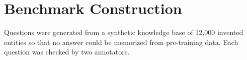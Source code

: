\chapter{Benchmark Construction}
\label{app:a}

Questions were generated from a synthetic knowledge base of 12,000 invented entities so that no
answer could be memorized from pre-training data. Each question was checked by two annotators.
